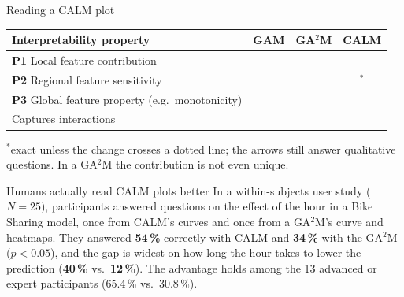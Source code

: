 \documentclass[final]{beamer}
\newcommand{\gamm}{GA$^2$M}
\newcommand{\method}{CALM}
\newcommand{\yes}{\ding{51}}
\newcommand{\no}{\ding{55}}
\newlength{\colwidth}
\begin{document}
\begin{frame}[t,fragile]
\begin{columns}[t]
\begin{column}{\colwidth}
\begin{block}{Reading a CALM plot}
        \smallskip
        \begin{center}
        \begin{tabular}{lccc}
          \toprule
          \textbf{Interpretability property} & \textbf{GAM} & \textbf{\gamm} & \textbf{\method} \\
          \midrule
          \textbf{P1} Local feature contribution  & \yes & \no & \yes \\
          \textbf{P2} Regional feature sensitivity & \yes & \no & \yes$^*$ \\
          \textbf{P3} Global feature property (e.g.\ monotonicity) & \yes & \no & \yes \\
          \midrule
          Captures interactions & \no & \yes & \yes \\
          \bottomrule
        \end{tabular}
        \end{center}
        {\small $^*$exact unless the change crosses a dotted line; the arrows still answer
        qualitative questions. In a \gamm{} the contribution is not even unique.}
      \end{block}

      \begin{block}{Humans actually read CALM plots better}
        In a within-subjects user study ($N=25$), participants answered questions on the effect
        of the hour in a Bike Sharing model, once from CALM's curves and once from a \gamm's
        curve and heatmaps. They answered \textbf{54\,\%} correctly with CALM and \textbf{34\,\%}
        with the \gamm{} ($p<0.05$), and the gap is widest on how long the hour takes to lower
        the prediction (\textbf{40\,\%} vs.\ \textbf{12\,\%}). The advantage holds among the 13
        advanced or expert participants (65.4\,\% vs.\ 30.8\,\%).
      \end{block}


\end{column}
\end{columns}
\end{frame}
\end{document}
